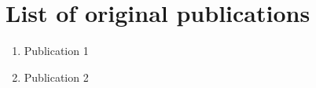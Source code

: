 
\chapter*{List of original publications}

\begin{enumerate}

\item{Publication 1}

\item{Publication 2}

\end{enumerate}